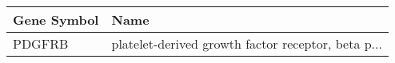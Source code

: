 \begin{tabular}{ll}
\toprule
Gene Symbol &                                               Name \\
\midrule
     PDGFRB & platelet-derived growth factor receptor, beta p... \\
\bottomrule
\end{tabular}
